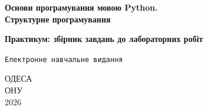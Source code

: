 \begin{titlepage}
	
	\LARGE \textbf{Основи програмування мовою Python.\\ Структурне програмування\\} %
	
	\vspace*{0.5\baselineskip} %
	
	\Large \textbf{Практикум: збірник завдань до лабораторних робіт }
	\vspace*{1.5\baselineskip}
	
	
	
	\vspace*{0.25\baselineskip}
	
	\texttt{Електронне навчальне видання}
	
	
	
	\vspace*{4\baselineskip}
	{ \large 
		ОДЕСА\\ \vspace{-1.5mm}
		ОНУ\\ \vspace{-2.5mm}
		2026 }%
	
	

\end{titlepage}
